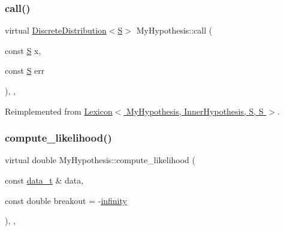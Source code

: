 \subsubsection{\texorpdfstring{call()}{call()}\hspace{0.1cm}{\footnotesize\ttfamily [2/2]}}
{\footnotesize\ttfamily virtual \hyperlink{class_discrete_distribution}{Discrete\+Distribution}$<$\hyperlink{_formal_language_theory-_complex_2_main_8cpp_a51c40915539205f0b5add30b0d68a4cb}{S}$>$ My\+Hypothesis\+::call (\begin{DoxyParamCaption}\item[{const \hyperlink{_formal_language_theory-_complex_2_main_8cpp_a51c40915539205f0b5add30b0d68a4cb}{S}}]{x,  }\item[{const \hyperlink{_formal_language_theory-_complex_2_main_8cpp_a51c40915539205f0b5add30b0d68a4cb}{S}}]{err }\end{DoxyParamCaption})\hspace{0.3cm}{\ttfamily [inline]}, {\ttfamily [override]}, {\ttfamily [virtual]}}



Reimplemented from \hyperlink{class_lexicon_afc6b762f68c6033a501ce7ca04b01ece}{Lexicon$<$ My\+Hypothesis, Inner\+Hypothesis, S, S $>$}.

\mbox{\label{class_my_hypothesis_ad5cd40d67c9b6fb61311a5f4a08df426}} 
\subsubsection{\texorpdfstring{compute\+\_\+likelihood()}{compute\_likelihood()}\hspace{0.1cm}{\footnotesize\ttfamily [1/2]}}
{\footnotesize\ttfamily virtual double My\+Hypothesis\+::compute\+\_\+likelihood (\begin{DoxyParamCaption}\item[{const \hyperlink{class_bayesable_aa2788c4d7718c0a824e1d28c4c98f921}{data\+\_\+t} \&}]{data,  }\item[{const double}]{breakout = {\ttfamily -\/\hyperlink{_numerics_8h_a1bb1e42ae1b40cad6e99da0aab8a5576}{infinity}} }\end{DoxyParamCaption})\hspace{0.3cm}{\ttfamily [inline]}, {\ttfamily [override]}, {\ttfamily [virtual]}}



